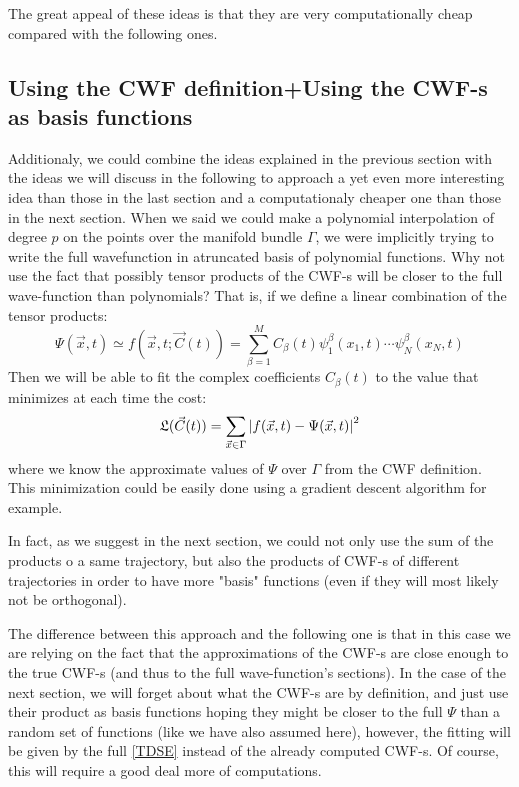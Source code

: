 \documentclass[11pt, a4paper]{article} %
\begin{document}
The great appeal of these ideas is that they are very computationally cheap compared with the following ones.

\subsection{Using the CWF definition+Using the CWF-s as basis functions}

Additionaly, we could combine the ideas explained in the previous section with the ideas we will discuss in the following to approach a yet even more interesting idea than those in the last section and a computationaly cheaper one than those in the next section. When we said we could make a polynomial interpolation of degree $p$ on the points over the manifold bundle $\Gamma$, we were implicitly trying to write the full wavefunction in atruncated basis of polynomial functions. Why not use the fact that possibly tensor products of the CWF-s will be closer to the full wave-function than polynomials? That is, if we define a linear combination of the tensor products:
$$
\Psi(\vec{x},t)\simeq f(\vec{x},t;\vec{C}(t))= \sum_{\beta=1}^{M} C_\beta(t) \psi^\beta_1(x_1,t)\cdots \psi^\beta_N(x_N,t)
$$
Then we will be able to fit the complex coefficients $C_\beta(t)$ to the value that minimizes at each time the cost:
$$
\mathfrak{L}(\vec{C}(t))=\sum_{\vec{x}\in \Gamma} \qty |f(\vec{x},t)-\Psi(\vec{x},t)|^2
$$
where we know the approximate values of $\Psi$ over $\Gamma$ from the CWF definition. This minimization could be easily done using a gradient descent algorithm for example.

In fact, as we suggest in the next section, we could not only use the sum of the products o a same trajectory, but also the products of CWF-s of different trajectories in order to have more "basis" functions (even if they will most likely not be orthogonal).

The difference between this approach and the following one is that in this case we are relying on the fact that the approximations of the CWF-s are close enough to the true CWF-s (and thus to the full wave-function's sections). In the case of the next section, we will forget about what the CWF-s are by definition, and just use their product as basis functions hoping they might be closer to the full $\Psi$ than a random set of functions (like we have also assumed here), however, the fitting will be given by the full \ref{TDSE} instead of the already computed CWF-s. Of course, this will require a good deal more of computations.
\end{document}
